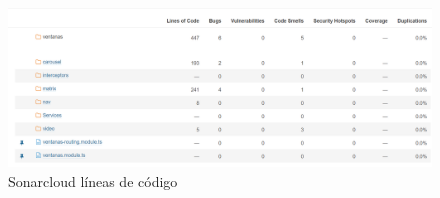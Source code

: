 \begin{figure}[h!] 
\centering
    \includegraphics[width=1\textwidth]{img/sonarcloud_lines_code_1.PNG}
\caption{Sonarcloud líneas de código}
\label{fig:sonarcloud_lines_code}
\end{figure}


